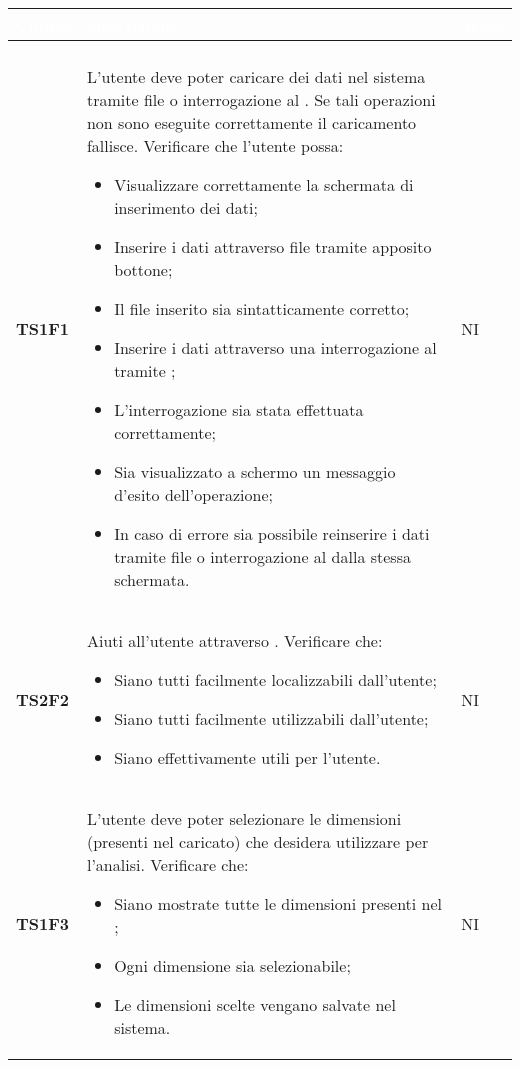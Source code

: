 \begin{longtable}{C{2cm} C{12cm} C{1.5cm}} 
		\textcolor{white}{\textbf{Codice}} & 
		\textcolor{white}{\textbf{Descrizione}} & 
		\textcolor{white}{\textbf{Stato}} \\
		\endfirsthead
		\\
	    \endfoot
	    \endlastfoot
		\hline
\textbf{TS1F1} & L'utente deve poter caricare dei dati nel sistema tramite file  o interrogazione al . Se tali operazioni non sono eseguite correttamente il caricamento fallisce. Verificare che l'utente possa: 
					\begin{itemize}
						\item Visualizzare correttamente la schermata di inserimento dei dati;
						\item Inserire i dati attraverso file  tramite apposito bottone;
						\item Il file  inserito sia sintatticamente corretto; 
						\item Inserire i dati attraverso una interrogazione al  tramite ;
						\item L'interrogazione sia stata effettuata correttamente;
						\item Sia visualizzato a schermo un messaggio d'esito dell'operazione;
						\item In caso di errore sia possibile reinserire i dati tramite file  o interrogazione al  dalla stessa schermata.
					\end{itemize}					 			    
			  & NI\\
\textbf{TS2F2} &  Aiuti all'utente attraverso . Verificare che:
					\begin{itemize}
						\item Siano tutti facilmente localizzabili dall'utente;
						\item Siano tutti facilmente utilizzabili dall'utente;
						\item Siano effettivamente utili per l'utente.
					\end{itemize}	
 			   & NI \\ 

\textbf{TS1F3} &  L'utente deve poter selezionare le dimensioni (presenti nel  caricato) che desidera utilizzare per l'analisi. Verificare che: 
					\begin{itemize}
						\item Siano mostrate tutte le dimensioni presenti nel ;			   
						\item Ogni dimensione sia selezionabile;
						\item Le dimensioni scelte vengano salvate nel sistema.
					\end{itemize}
			   &  NI \\



\end{longtable}
